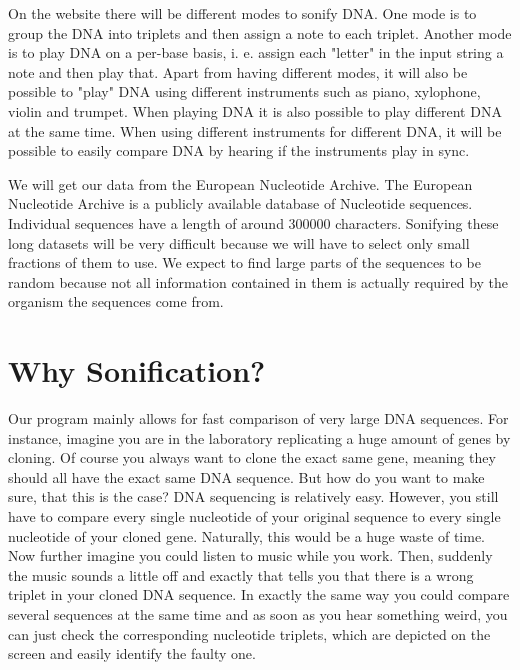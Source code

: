\documentclass[10pt]{article}
\begin{document}
On the website there will be different modes to sonify DNA. One mode is to group the DNA into triplets and then assign a note to each triplet. Another mode is to play DNA on a per-base basis, i. e. assign each "letter" in the input string a note and then play that. Apart from having different modes, it will also be possible to "play" DNA using different instruments such as piano, xylophone, violin and trumpet. When playing DNA it is also possible to play different DNA at the same time. When using different instruments for different DNA, it will be possible to easily compare DNA by hearing if the instruments play in sync. 

We will get our data from the European Nucleotide Archive. The European Nucleotide Archive is a publicly available database of Nucleotide sequences. Individual sequences have a length of around 300000 characters. Sonifying these long datasets will be very difficult because we will have to select only small fractions of them to use. We expect to find large parts of the sequences to be random because not all information contained in them is actually required by the organism the sequences come from.

\section{Why Sonification?}

Our program mainly allows for fast comparison of very large DNA sequences. For instance, imagine you are in the laboratory replicating a huge amount of genes by cloning. Of course you always want to clone the exact same gene, meaning they should all have the exact same DNA sequence. But how do you want to make sure, that this is the case?
DNA sequencing is relatively easy. However, you still have to compare every single nucleotide of your original sequence to every single nucleotide of your cloned gene. Naturally, this would be a huge waste of time.
Now further imagine you could listen to music while you work. Then, suddenly the music sounds a little off and exactly that tells you that there is a wrong triplet in your cloned DNA sequence. In exactly the same way you could compare several sequences at the same time and as soon as you hear something weird, you can just check the corresponding nucleotide triplets, which are depicted on the screen and easily identify the faulty one. 
\end{document}
